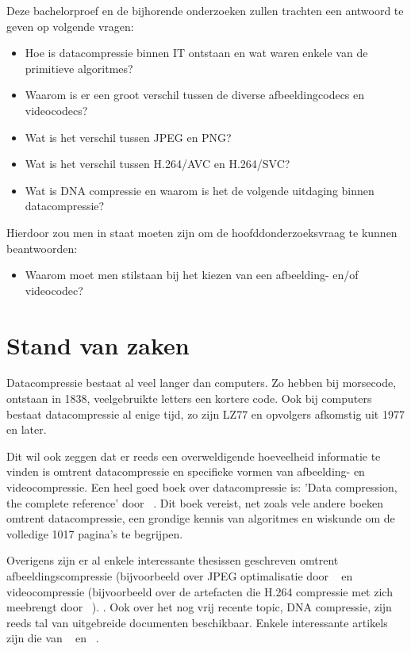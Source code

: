 Deze bachelorproef en de bijhorende onderzoeken zullen trachten een antwoord te geven op volgende vragen: 
\begin{itemize}
    \item{Hoe is datacompressie binnen IT ontstaan en wat waren enkele van de primitieve algoritmes?}
     \item{Waarom is er een groot verschil tussen de diverse afbeeldingcodecs en videocodecs?}
     \item{Wat is het verschil tussen JPEG en PNG?}
      \item{Wat is het verschil tussen H.264/AVC en H.264/SVC?}
      \item{Wat is DNA compressie en waarom is het de volgende uitdaging binnen datacompressie?}
\end{itemize}
Hierdoor zou men in staat moeten zijn om de hoofddonderzoeksvraag te kunnen beantwoorden:  
\begin{itemize}
    \item{Waarom moet men stilstaan bij het kiezen van een afbeelding- en/of videocodec?}
\end{itemize}

\section{Stand van zaken}
\label{sec:stand-van-zaken}

Datacompressie bestaat al veel langer dan computers. Zo hebben bij morsecode, ontstaan in 1838, veelgebruikte letters een kortere code. Ook bij computers bestaat datacompressie al enige tijd, zo zijn LZ77 en opvolgers afkomstig uit 1977 en later. \autocite{Riha2011} 

Dit wil ook zeggen dat er reeds een overweldigende hoeveelheid informatie te vinden is omtrent datacompressie en specifieke vormen van afbeelding- en videocompressie. Een heel goed boek over datacompressie is: 'Data compression, the complete reference' door  ~\textcite{Salomon2006}. Dit boek vereist, net zoals vele andere boeken omtrent datacompressie,  een grondige kennis van algoritmes en wiskunde om de volledige 1017 pagina's te begrijpen.

Overigens zijn er al enkele interessante thesissen geschreven omtrent afbeeldingscompressie (bijvoorbeeld over JPEG optimalisatie door ~\textcite{Wahlstrom2015} en videocompressie (bijvoorbeeld over de artefacten die H.264 compressie met zich meebrengt door  ~\textcite{Rakesh2013}). . Ook over het nog vrij recente topic, DNA compressie, zijn reeds tal van uitgebreide documenten beschikbaar. Enkele interessante artikels zijn die van ~\textcite{Afify2011} en ~\textcite{Kuruppu2012}. 

